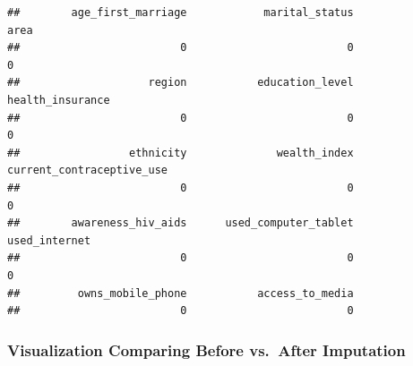 \documentclass[
]{article}
\begin{document}
\begin{verbatim}
##        age_first_marriage            marital_status                      area 
##                         0                         0                         0 
##                    region           education_level          health_insurance 
##                         0                         0                         0 
##                 ethnicity              wealth_index current_contraceptive_use 
##                         0                         0                         0 
##        awareness_hiv_aids      used_computer_tablet             used_internet 
##                         0                         0                         0 
##         owns_mobile_phone           access_to_media 
##                         0                         0
\end{verbatim}

\hypertarget{visualization-comparing-before-vs.-after-imputation}{%
\subsubsection{Visualization Comparing Before vs.~After
Imputation}\label{visualization-comparing-before-vs.-after-imputation}}
\end{document}
